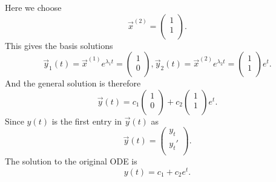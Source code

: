 Here we choose
\[ 
\Vec{x}^{(2)} = \begin{pmatrix}
1\\
1\\
\end{pmatrix}
.\]
This gives the basis solutions
\[ 
\Vec{y}_1(t) = \Vec{x}^{(1)} e^{\lambda_1 t} = \begin{pmatrix}
1\\
0\\
\end{pmatrix}, \Vec{y}_2(t) = \Vec{x}^{(2)} e^{\lambda_2 t} = \begin{pmatrix}
1\\
1\\
\end{pmatrix} e^{t}
.\]
And the general solution is therefore
\[ 
\Vec{y}(t) = c_1 \begin{pmatrix}
1\\
0\\
\end{pmatrix} + c_2 \begin{pmatrix}
1\\
1\\
\end{pmatrix} e^{t}
.\]
Since $y(t)$ is the first entry in $\Vec{y}(t)$ as
\[ 
\Vec{y}(t) = \begin{pmatrix}
y_t\\
y_t'\\
\end{pmatrix}
.\]
The solution to the original ODE is
\[ 
y(t) = c_1 + c_2 e^{t}
.\]

